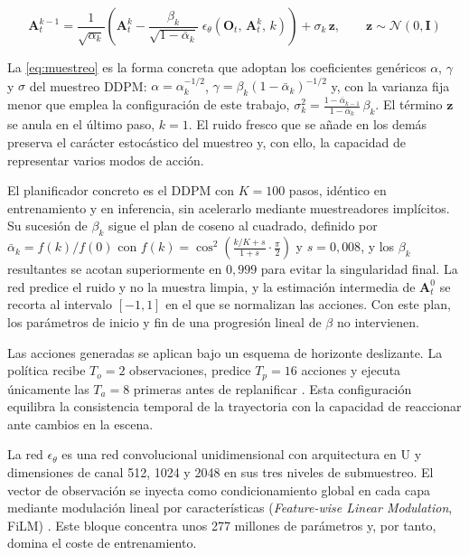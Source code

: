\begin{equation}
  \mathbf{A}^{k-1}_t = \frac{1}{\sqrt{\alpha_k}}\left(\mathbf{A}^{k}_t -
    \frac{\beta_k}{\sqrt{1-\bar{\alpha}_k}}\;
    \epsilon_\theta\!\left(\mathbf{O}_t,\, \mathbf{A}^{k}_t,\, k\right)\right)
    + \sigma_k\,\mathbf{z},
  \qquad \mathbf{z}\sim\mathcal{N}(0,\mathbf{I})
  \label{eq:muestreo}
\end{equation}

La \cref{eq:muestreo} es la forma concreta que adoptan los coeficientes gen\'ericos
$\alpha$, $\gamma$ y $\sigma$ del muestreo DDPM: $\alpha = \alpha_k^{-1/2}$,
$\gamma = \beta_k(1-\bar{\alpha}_k)^{-1/2}$ y, con la varianza fija menor que emplea la
configuraci\'on de este trabajo,
$\sigma_k^2 = \tfrac{1-\bar{\alpha}_{k-1}}{1-\bar{\alpha}_k}\,\beta_k$. El t\'ermino
$\mathbf{z}$ se anula en el \'ultimo paso, $k=1$. El ruido fresco que se a\~nade en los
dem\'as preserva el car\'acter estoc\'astico del muestreo y, con ello, la capacidad de
representar varios modos de acci\'on.

El planificador concreto es el DDPM con $K = \num{100}$ pasos, id\'entico en entrenamiento
y en inferencia, sin acelerarlo mediante muestreadores impl\'icitos. Su sucesi\'on de
$\beta_k$ sigue el plan de coseno al cuadrado, definido por
$\bar{\alpha}_k = f(k)/f(0)$ con
$f(k) = \cos^2\!\left(\tfrac{k/K + s}{1+s}\cdot\tfrac{\pi}{2}\right)$ y
$s = 0{,}008$, y los $\beta_k$ resultantes se acotan superiormente en $0{,}999$ para
evitar la singularidad final. La red predice el ruido y no la muestra limpia, y la
estimaci\'on intermedia de $\mathbf{A}^0_t$ se recorta al intervalo $[-1,1]$ en el que se
normalizan las acciones. Con este plan, los par\'ametros de inicio y fin de una
progresi\'on lineal de $\beta$ no intervienen.

Las acciones generadas se aplican bajo un esquema de horizonte deslizante. La pol\'itica
recibe $T_o = 2$ observaciones, predice $T_p = 16$ acciones y ejecuta \'unicamente las
$T_a = 8$ primeras antes de replanificar \cite{chi2025diffusion}. Esta configuraci\'on
equilibra la consistencia temporal de la trayectoria con la capacidad de reaccionar ante
cambios en la escena.

La red $\epsilon_\theta$ es una red convolucional unidimensional con arquitectura en U y
dimensiones de canal \num{512}, \num{1024} y \num{2048} en sus tres niveles de
submuestreo. El vector de observaci\'on se inyecta como condicionamiento global en cada
capa mediante modulaci\'on lineal por caracter\'isticas (\textit{Feature-wise Linear
Modulation}, FiLM) \cite{perez2018film}. Este bloque concentra unos \num{277} millones de
par\'ametros y, por tanto, domina el coste de entrenamiento.

